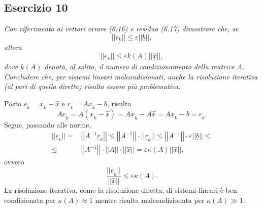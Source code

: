 \subsection{Esercizio 10}
\label{sub:es10}
\emph{Con riferimento ai vettori errore (6.16) e residuo (6.17) dimostrare che, se
			\begin{equation}
				\label{criterioArrestoSplitting}
				||\underline{r_k}||\leq\varepsilon||\underline{b}||,
			\end{equation}
			allora
			$$||\underline{e_k}||\leq\varepsilon k(A)||\underline{\hat{x}}||,$$
			dove $k(A)$ denota, al solito, il numero di condizionamento della matrice $A$.
      Concludere che, per sistemi lineari malcondizionati, anche la risoluzione iterativa (al pari di quella diretta)
      risulta essere più problematica.}
\begin{sol}
  Posto $\underline{e}_k=\underline{x}_k-\underline{\hat{x}}$
  e $\underline{r}_k=A\underline{x}_k-\underline{b}$, risulta
  $$A\underline{e}_k=A(\underline{x}_k-\underline{\hat{x}})=A\underline{x}_k-A\underline{\hat{x}}=A\underline{x}_k-b=\underline{r}_k.$$
  Segue, passando alle norme,
  \begin{equation}\begin{split}||\underline{e}_k||=&\left|\left|A^{-1}\underline{r}_k\right|\right|\leq\left|\left|A^{-1}\right|\right|\cdot||\underline{r}_k||\leq\left|\left|A^{-1}\right|\right|\cdot\varepsilon||\underline{b}||\leq\\\leq&\left|\left|A^{-1}\right|\right|\cdot\left|\left|A\right|\right|\cdot||\underline{\hat{x}}||=\varepsilon\kappa(A)||\underline{\hat{x}}||,\end{split}\end{equation}
  ovvero $$\frac{||\underline{e}_k||}{||\underline{\hat{x}}||}\leq\varepsilon\kappa(A).$$
  La risoluzione iterativa, come la risoluzione diretta, di sistemi lineari è ben condizionata per
  $\kappa(A)\approx 1$ mentre risulta malcondizionata per $\kappa(A)\gg 1$.
\end{sol}

